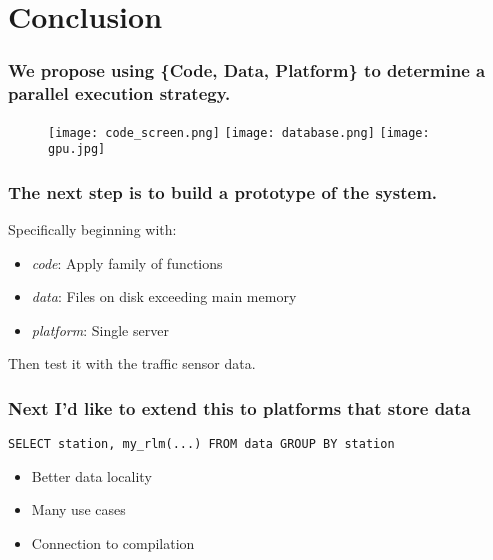 \documentclass{beamer}
\begin{document}
\section{Conclusion}
\begin{frame}

%
%
%

    \frametitle{We propose using \{Code, Data, Platform\} to determine a
    parallel execution strategy.}

\begin{figure}
            \texttt{[image: code\_screen.png]}
            \hfill
            \texttt{[image: database.png]}
            \hfill
            \texttt{[image: gpu.jpg]}
\end{figure}

\end{frame}
\begin{frame}

    \frametitle{The next step is to build a prototype of the system.}

    Specifically beginning with:

\begin{itemize}
    \item \emph{code}: Apply family of functions
    \item \emph{data}: Files on disk exceeding main memory
    \item \emph{platform}: Single server
\end{itemize}

Then test it with the traffic sensor data.

\end{frame}
\begin{frame}[fragile]

\frametitle{Next I'd like to extend this to platforms that store data}

\begin{verbatim}
SELECT station, my_rlm(...) FROM data GROUP BY station
\end{verbatim}


\begin{itemize}
    \item Better data locality
    \item Many use cases
    \item Connection to compilation
\end{itemize}

\end{frame}
\end{document}
